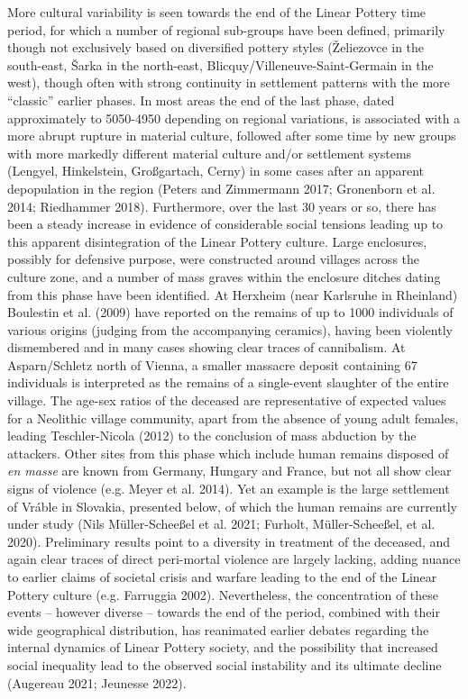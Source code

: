 \documentclass[
  12pt,
  a4paper, twoside]{book}
\begin{document}
More cultural variability is seen towards the end of the Linear Pottery time period, for which a number of regional sub-groups have been defined, primarily though not exclusively based on diversified pottery styles (Želiezovce in the south-east, Šarka in the north-east, Blicquy/Villeneuve-Saint-Germain in the west), though often with strong continuity in settlement patterns with the more ``classic'' earlier phases. In most areas the end of the last phase, dated approximately to 5050-4950 depending on regional variations, is associated with a more abrupt rupture in material culture, followed after some time by new groups with more markedly different material culture and/or settlement systems (Lengyel, Hinkelstein, Großgartach, Cerny) in some cases after an apparent depopulation in the region (Peters and Zimmermann 2017; Gronenborn et al. 2014; Riedhammer 2018). Furthermore, over the last 30 years or so, there has been a steady increase in evidence of considerable social tensions leading up to this apparent disintegration of the Linear Pottery culture. Large enclosures, possibly for defensive purpose, were constructed around villages across the culture zone, and a number of mass graves within the enclosure ditches dating from this phase have been identified. At Herxheim (near Karlsruhe in Rheinland) Boulestin et al. (2009) have reported on the remains of up to 1000 individuals of various origins (judging from the accompanying ceramics), having been violently dismembered and in many cases showing clear traces of cannibalism. At Asparn/Schletz north of Vienna, a smaller massacre deposit containing 67 individuals is interpreted as the remains of a single-event slaughter of the entire village. The age-sex ratios of the deceased are representative of expected values for a Neolithic village community, apart from the absence of young adult females, leading Teschler-Nicola (2012) to the conclusion of mass abduction by the attackers. Other sites from this phase which include human remains disposed of \emph{en masse} are known from Germany, Hungary and France, but not all show clear signs of violence (e.g. Meyer et al. 2014). Yet an example is the large settlement of Vráble in Slovakia, presented below, of which the human remains are currently under study (Nils Müller-Scheeßel et al. 2021; Furholt, Müller-Scheeßel, et al. 2020). Preliminary results point to a diversity in treatment of the deceased, and again clear traces of direct peri-mortal violence are largely lacking, adding nuance to earlier claims of societal crisis and warfare leading to the end of the Linear Pottery culture (e.g. Farruggia 2002). Nevertheless, the concentration of these events -- however diverse -- towards the end of the period, combined with their wide geographical distribution, has reanimated earlier debates regarding the internal dynamics of Linear Pottery society, and the possibility that increased social inequality lead to the observed social instability and its ultimate decline (Augereau 2021; Jeunesse 2022).
\end{document}
